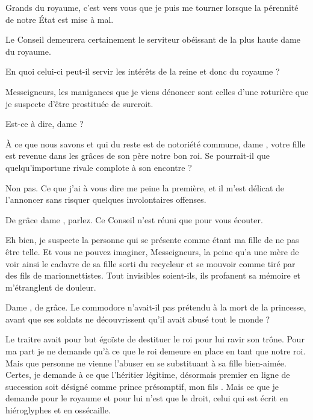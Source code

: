 \scene

\StageDirII{\reine, \nobleOne, \nobleTwo, \nobleTree}


\begin{drama}
  \reinespeaks Grands du royaume, c’est vers vous que je puis me tourner lorsque la pérennité de notre État est mise à mal. 

  \nobleOnespeaks Le Conseil demeurera certainement le serviteur obéissant de la plus haute dame du royaume.

  \nobleTwospeaks En quoi celui-ci peut-il servir les intérêts de la reine et donc du royaume ?

  \reinespeaks Messeigneurs, les manigances que je viens dénoncer sont celles d’une roturière  que je suspecte d’être prostituée de surcroit.

  \nobleOnespeaks Est-ce à dire, dame \reine ?

  \nobleTreespeaks À ce que nous savons et qui du reste est de notoriété commune, dame \princesse, votre fille est revenue dans les grâces de son père notre bon roi. Se pourrait-il que quelqu’importune rivale complote à son encontre ?

  \reinespeaks Non pas. Ce que j’ai à vous dire me peine la première, et il m’est délicat de l’annoncer sans risquer quelques involontaires offenses.

  \nobleOnespeaks De grâce dame \reine, parlez. Ce Conseil n’est réuni que pour vous écouter.

  \reinespeaks Eh bien, je suspecte la personne qui se présente comme étant ma fille \princesse{} de ne pas être telle. Et vous ne pouvez imaginer, Messeigneurs, la peine qu’a une mère de voir ainsi le cadavre de sa fille sorti du recycleur et se mouvoir comme tiré par des fils de marionnettistes. Tout invisibles soient-ils, ils profanent sa mémoire et m’étranglent de douleur. 


  \nobleOnespeaks Dame \reine, de grâce. Le commodore \general{}  n’avait-il pas prétendu à la mort de la princesse, avant que ses soldats ne découvrissent qu’il avait abusé tout le monde ?

  \reinespeaks Le traitre avait pour but égoïste de destituer le roi pour lui ravir son trône. Pour ma part je ne demande qu’à ce que le roi demeure en place en tant que notre roi. Mais que personne ne vienne l’abuser en se substituant à sa fille bien-aimée. Certes, je demande à ce que l’héritier légitime, désormais premier en ligne de succession soit désigné comme prince présomptif, mon fils \vladimir{}. Mais ce que je demande pour le royaume et pour lui n’est que le droit, celui qui est écrit en hiéroglyphes et en ossécaille.


\end{drama}
